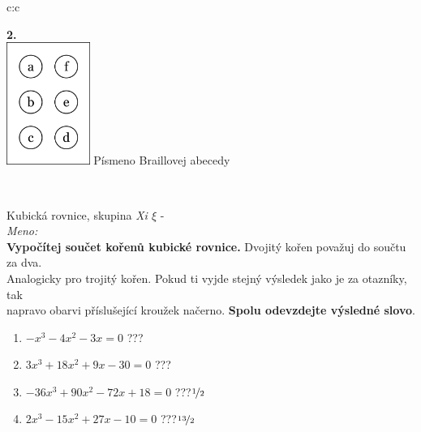\documentclass[10pt]{report}
\begin{document}
\begin{tabular}{c:c}
\begin{minipage}[c][99mm][t]{0.49\linewidth}
\begin{center}
\begin{minipage}{0.77\linewidth}
\begin{center}
\end{center}
\end{minipage}
\begin{minipage}{0.20\linewidth}
\begin{center}
{\Huge\bfseries 2.} \\[2mm]
\includegraphics[height=40mm]{../images/braille.png}
{\small Písmeno Braillovej abecedy}
\end{center}
\end{minipage}
\end{center}
\end{minipage}
\\ \hdashline
\begin{minipage}[c][99mm][t]{0.49\linewidth}
\begin{center}
\vspace{7mm}
{\huge Kubická rovnice, skupina \textit{Xi $\xi$} -}\\[4.5mm]
\textit{Meno:}\phantom{xxxxxxxxxxxxxxxxxxxxxxxxxxxxxxxxxxxxxxxxxxxxxxxxxxxxxxxxxxxxxxxxx}\\[3.5mm]
\textbf{Vypočítej součet kořenů kubické rovnice.} Dvojitý kořen považuj do součtu za dva.\\Analogicky pro trojitý kořen. Pokud ti vyjde stejný výsledek jako je za otazníky, tak\\napravo obarvi příslušející kroužek načerno. \textbf{Spolu odevzdejte výsledné slovo}.\\[3mm]
\begin{minipage}{0.77\linewidth}
\begin{center}
\begin{varwidth}{\textwidth}
\begin{enumerate}
\large
\item $-x^3-4x^2-3x=0$\quad \dotfill\; ???\;\dotfill {}
\item $3x^3+18x^2+9x-30=0$\quad \dotfill\; ???\;\dotfill {}
\item $-36x^3+90x^2-72x+18=0$\quad \dotfill\; ???\;\dotfill \quad $\nicefrac{1}{2}$
\item $2x^3-15x^2+27x-10=0$\quad \dotfill\; ???\;\dotfill \quad $\nicefrac{13}{2}$

\end{enumerate}
\end{varwidth}
\end{center}
\end{minipage}
\end{center}
\end{minipage}
\end{tabular}
\end{document}

